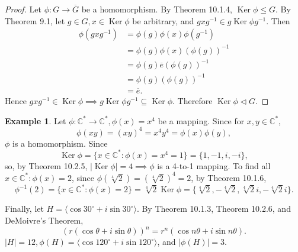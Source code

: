 \documentclass{article}
\theoremstyle{definition}
\newtheorem{example}{Example}[section]
\DeclareMathOperator{\Ker}{Ker}
\begin{document}
    \begin{proof}
       Let $\phi:G\to\overline{G}$ be a homomorphism. By Theorem 10.1.4, $\Ker\phi\leq G$. By Theorem 9.1, let $g\in G, x\in \Ker\phi$ be arbitrary, and $gxg^{-1} \in g\Ker\phi g^{-1}$. Then
       \begin{align*}
           \phi(gxg^{-1}) &= \phi(g)\phi(x)\phi(g^{-1}) \\ &= \phi(g)\phi(x)(\phi(g))^{-1} \\
           &= \phi(g)\overline{e}(\phi(g))^{-1} \\
           &= \phi(g)(\phi(g))^{-1} \\
           &= \overline{e}.
       \end{align*}
       Hence $gxg^{-1} \in\Ker\phi \implies g\Ker\phi g^{-1} \subseteq\Ker\phi$. Therefore $\Ker\phi\lhd G$.
    \end{proof}
    
    \begin{example}
        Let $\phi:\mathbb{C}^*\to\mathbb{C}^*,\phi(x)=x^4$ be a mapping. Since for $x,y \in \mathbb{C}^*$,
        \begin{equation*}
            \phi(xy)=(xy)^4=x^4y^4=\phi(x)\phi(y),
        \end{equation*}
        $\phi$ is a homomorphism. Since
        \begin{equation*}
            \Ker\phi=\{x\in\mathbb{C}^*:\phi(x)=x^4=1\}=\{1,-1,i,-i\},
        \end{equation*}
        so, by Theorem 10.2.5, $|\Ker\phi|=4 \implies \phi$ is a 4-to-1 mapping. To find all $x\in\mathbb{C}^*:\phi(x)=2$, since $\phi(\sqrt[4]{2})=(\sqrt[4]{2})^4=2$, by Theorem 10.1.6,
        \begin{equation*}
            \phi^{-1}(2)=\{x\in\mathbb{C}^*:\phi(x)=2\}=\sqrt[4]{2}\Ker\phi=\{\sqrt[4]{2},-\sqrt[4]{2},\sqrt[4]{2}i,-\sqrt[4]{2}i\}.
        \end{equation*}
        
        Finally, let $H=\langle\cos{30^\circ}+i\sin{30^\circ}\rangle$. By Theorem 10.1.3, Theorem 10.2.6, and DeMoivre's Theorem,
        \begin{equation*}
            (r(\cos{\theta}+i\sin{\theta}))^n = r^n(\cos{n\theta}+i\sin{n\theta}).
        \end{equation*}$|H|=12,\phi(H)=\langle\cos{120^\circ+i\sin{120^\circ}}\rangle$, and $|\phi(H)|=3$.
    \end{example}
    
\end{document}
